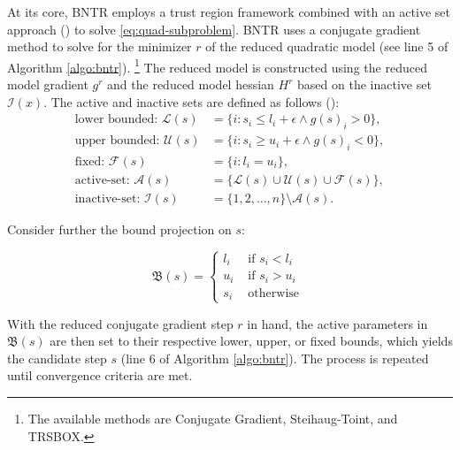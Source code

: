 \noindent At its core, BNTR employs a trust region framework combined with an active set approach (\cite{TAO21}) to solve \ref{eq:quad-subproblem}. BNTR uses a conjugate gradient method to solve for the minimizer $r$ of the reduced quadratic model (see line 5 of Algorithm \ref{algo:bntr}). \footnote{The available methods are Conjugate Gradient, Steihaug-Toint, and TRSBOX.}
The reduced model is constructed using the reduced model gradient $g^r$ and the reduced model hessian $H^r$ based on the inactive set $\mathcal{I}(x)$. The active and inactive sets are defined as follows (\cite{Bertsekas1982}):
\begin{align*}
\text{lower bounded: } \mathcal{L}(s) & = \{i: s_i \leq l_i + \epsilon \wedge g(s)_i > 0\}, \\
\text{upper bounded: } \mathcal{U}(s) & = \{i: s_i \geq u_i + \epsilon \wedge g(s)_i < 0\}, \\
\text{fixed: } \mathcal{F}(s) & = \{i: l_i = u_i\}, \\
\text{active-set: } \mathcal{A}(s) & = \{\mathcal{L}(s) \cup \mathcal{U}(s) \cup \mathcal{F}(s)\}, \\
\text{inactive-set: } \mathcal{I}(s) & = \{1,2,\ldots,n\} \setminus \mathcal{A}(s).
\end{align*}

\noindent Consider further the bound projection on $s$:

$$
\mathfrak{B}(s)= \begin{cases}l_i & \text { if } s_i<l_i \\ u_i & \text { if } s_i>u_i \\ s_i & \text { otherwise }\end{cases}
$$

\noindent With the reduced conjugate gradient step $r$ in hand, the active parameters in $\mathfrak{B}(s)$ are then set to their respective lower, upper, or fixed bounds, which yields the candidate step $s$ (line 6 of Algorithm \ref{algo:bntr}). The process is repeated until convergence criteria are met.

